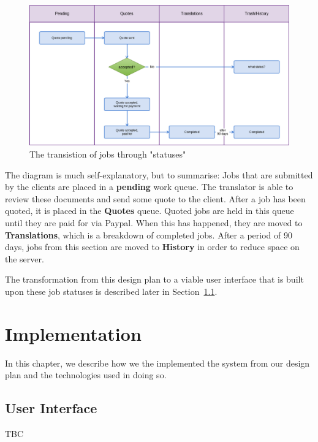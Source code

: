 \documentclass{l3proj}
\begin{document}
\begin{figure}
\begin{center}
\includegraphics[width=\linewidth]{jobstatuses}
\caption{The transistion of jobs through "statuses"}
\end{center}
\end{figure}

The diagram is much self-explanatory, but to summarise: Jobs that are submitted by the clients are placed in a \textbf{pending} work queue. The translator is able to review these documents and send some quote to the client. After a job has been quoted, it is placed in the \textbf{Quotes} queue. Quoted jobs are held in this queue until they are paid for via Paypal. When this has happened, they are moved to \textbf{Translations}, which is a breakdown of completed jobs. After a period of 90 days, jobs from this section are moved to \textbf{History} in order to reduce space on the server.

The transformation from this design plan to a viable user interface that is built upon these job statuses is described later in Section~\ref{chap:ui}.
\chapter{Implementation}
\label{chap:impl}

In this chapter, we describe how we the implemented the system from our design plan and the technologies used in doing so.

\section{User Interface}
\label{chap:ui}
TBC
\end{document}
